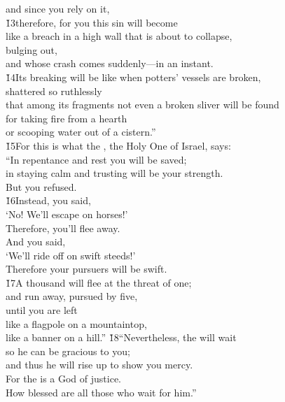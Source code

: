 \begin{poetry}
\poemlll       and since you rely on it, \\
\poeml \v{13}therefore, for you this sin will become \\
\poemll    like a breach in a high wall that is about to collapse, \\
\poemlll       bulging out, \\
\poemll    and whose crash comes suddenly---in an instant. \\
\poeml \v{14}Its breaking will be like when potters' vessels are broken, \\
\poemll    shattered so ruthlessly \\
\poeml that among its fragments not even a broken sliver will be found \\
\poemll    for taking fire from a hearth \\
\poemlll       or scooping water out of a cistern.'' \\
\poeml \v{15}For this is what the  , the Holy One of Israel, says: \\
\poeml ``In repentance and rest you will be saved; \\
\poemll    in staying calm and trusting will be your strength. \\
\poemlll       But you refused. \\
\poeml \v{16}Instead, you said, \\
\poemll    `No! We'll escape on horses!' \\
\poemlll       Therefore, you'll flee away. \\
\poeml And you said, \\
\poemll    `We'll ride off on swift steeds!' \\
\poemlll       Therefore your pursuers will be swift. \\
\poeml \v{17}A thousand will flee at the threat of one; \\
\poemll    and run away, pursued by five, \\
\poeml until you are left \\
\poemll    like a flagpole on a mountaintop, \\
\poemlll       like a banner on a hill.''
\poeml \v{18}``Nevertheless, the  will wait \\
\poemll    so he can be gracious to you; \\
\poemlll       and thus he will rise up to show you mercy. \\
\poeml For the  is a God of justice. \\
\poemll    How blessed are all those who wait for him.''
\end{poetry}

